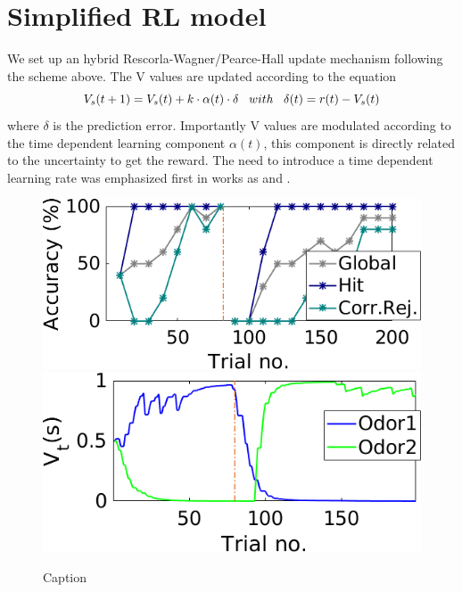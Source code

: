 \chapter{Simplified RL model}
We set up an hybrid Rescorla-Wagner/Pearce-Hall update mechanism following the scheme above.
The V values are updated according to the equation
\begin{equation}
V_s(t+1)=V_s(t)+k\cdot\alpha(t)\cdot\delta  \hspace{0.3cm} with \hspace{0.3cm}\delta(t)=r(t)-V_s(t)
\label{VValues}
\end{equation}
where $\delta$ is the prediction error. Importantly V values are modulated according to the time dependent learning component $\alpha(t)$, this component is directly related to the uncertainty to get the reward. The need to introduce a time dependent learning rate was emphasized first in works as \cite{Daw} and \cite{Funamizu}.
\begin{figure}
    \centering
    \includegraphics[scale=0.8]{figures/Lastrev1_V05_An6_Perf1.png}
    \includegraphics[scale=0.8]{figures/Lastrev1_V05_An6Values.png}
    
    \caption{Caption}
    \label{fig:RL_ex}
\end{figure}

